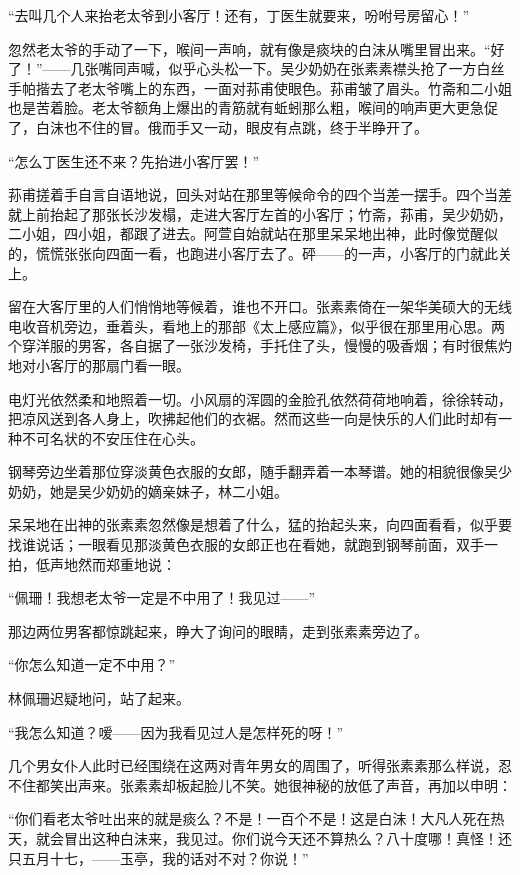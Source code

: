 \par “去叫几个人来抬老太爷到小客厅！还有，丁医生就要来，吩咐号房留心！”
\par 忽然老太爷的手动了一下，喉间一声响，就有像是痰块的白沫从嘴里冒出来。“好了！”——几张嘴同声喊，似乎心头松一下。吴少奶奶在张素素襟头抢了一方白丝手帕揩去了老太爷嘴上的东西，一面对荪甫使眼色。荪甫皱了眉头。竹斋和二小姐也是苦着脸。老太爷额角上爆出的青筋就有蚯蚓那么粗，喉间的响声更大更急促了，白沫也不住的冒。俄而手又一动，眼皮有点跳，终于半睁开了。
\par “怎么丁医生还不来？先抬进小客厅罢！”
\par 荪甫搓着手自言自语地说，回头对站在那里等候命令的四个当差一摆手。四个当差就上前抬起了那张长沙发榻，走进大客厅左首的小客厅；竹斋，荪甫，吴少奶奶，二小姐，四小姐，都跟了进去。阿萱自始就站在那里呆呆地出神，此时像觉醒似的，慌慌张张向四面一看，也跑进小客厅去了。砰——的一声，小客厅的门就此关上。
\par 留在大客厅里的人们悄悄地等候着，谁也不开口。张素素倚在一架华美硕大的无线电收音机旁边，垂着头，看地上的那部《太上感应篇》，似乎很在那里用心思。两个穿洋服的男客，各自据了一张沙发椅，手托住了头，慢慢的吸香烟；有时很焦灼地对小客厅的那扇门看一眼。
\par 电灯光依然柔和地照着一切。小风扇的浑圆的金脸孔依然荷荷地响着，徐徐转动，把凉风送到各人身上，吹拂起他们的衣裾。然而这些一向是快乐的人们此时却有一种不可名状的不安压住在心头。
\par 钢琴旁边坐着那位穿淡黄色衣服的女郎，随手翻弄着一本琴谱。她的相貌很像吴少奶奶，她是吴少奶奶的嫡亲妹子，林二小姐。
\par 呆呆地在出神的张素素忽然像是想着了什么，猛的抬起头来，向四面看看，似乎要找谁说话；一眼看见那淡黄色衣服的女郎正也在看她，就跑到钢琴前面，双手一拍，低声地然而郑重地说：
\par “佩珊！我想老太爷一定是不中用了！我见过——”
\par 那边两位男客都惊跳起来，睁大了询问的眼睛，走到张素素旁边了。
\par “你怎么知道一定不中用？”
\par 林佩珊迟疑地问，站了起来。
\par “我怎么知道？嗳——因为我看见过人是怎样死的呀！”
\par 几个男女仆人此时已经围绕在这两对青年男女的周围了，听得张素素那么样说，忍不住都笑出声来。张素素却板起脸儿不笑。她很神秘的放低了声音，再加以申明：
\par “你们看老太爷吐出来的就是痰么？不是！一百个不是！这是白沫！大凡人死在热天，就会冒出这种白沫来，我见过。你们说今天还不算热么？八十度哪！真怪！还只五月十七，——玉亭，我的话对不对？你说！”
